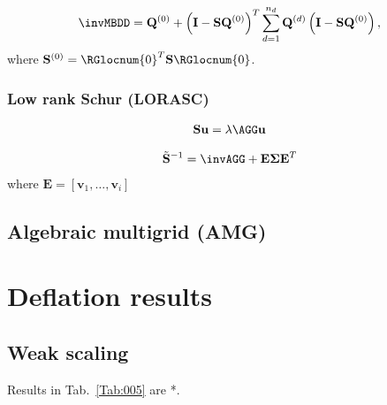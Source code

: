 \documentclass{article}
\begin{document}
\begin{align}
\invMBDD=
{\mathbf{Q}^{(0)}}
+
\left(\mathbf{I}-\mathbf{S}\mathbf{Q}^{(0)}\right)^T
\sum_{d=1}^{n_d}
\mathbf{Q}^{(d)}
\left(\mathbf{I}-\mathbf{S}\mathbf{Q}^{(0)}\right),
\end{align}
where $\mathbf{S}^{(0)}=\RGlocnum{0}^T\mathbf{S}\RGlocnum{0}$.


\subsubsection{Low rank Schur (LORASC)}

\begin{align}
\mathbf{S}\mathbf{u}=\lambda\AGG\mathbf{u}
\end{align}

\begin{align}
\tilde{\mathbf{S}}^{-1}=\invAGG+\mathbf{E}\boldsymbol{\Sigma}\mathbf{E}^T
\end{align}
where $\mathbf{E}=[\mathbf{v}_1,\dots,\mathbf{v}_i]$

\subsection{Algebraic multigrid (AMG)}

\section{Deflation results}

\subsection{Weak scaling}
Results in Tab.~\ref{Tab:005} are *.


\end{document}
